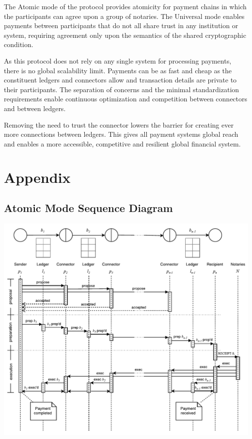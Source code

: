 \documentclass[letterpaper,twocolumn,10pt]{article}
\begin{document}
The Atomic mode of the protocol provides atomicity for payment chains in which the participants can agree upon a group of notaries. The Universal mode enables payments between participants that do not all share trust in any institution or system, requiring agreement only upon the semantics of the shared cryptographic condition.

As this protocol does not rely on any single system for processing payments, there is no global scalability limit. Payments can be as fast and cheap as the constituent ledgers and connectors allow and transaction details are private to their participants. The separation of concerns and the minimal standardization requirements enable continuous optimization and competition between connectors and between ledgers.

Removing the need to trust the connector lowers the barrier for creating ever more connections between ledgers. This gives all payment systems global reach and enables a more accessible, competitive and resilient global financial system.



{\footnotesize 
}

\clearpage
\appendix
\section{Appendix}

\subsection{Atomic Mode Sequence Diagram}
\label{sec:Atomic-sequence}


\begin{minipage}{\textwidth}
    \centering
    \includegraphics[width=\textwidth]{figures/atomic-sequence.pdf}
\end{minipage}
\end{document}
